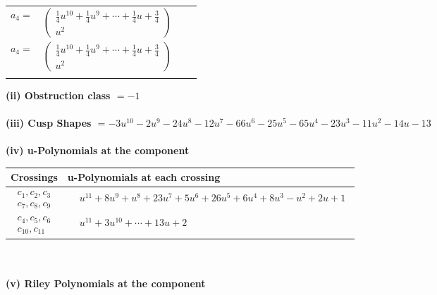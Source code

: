 \documentclass[1p]{elsarticle_modified}
\theoremstyle{definition}
\begin{document}
\begin{tabular}{m{7pt} m{180pt} m{7pt} m{180pt} }
\flushright $a_{4}=$&$\begin{pmatrix}\frac{1}{4} u^{10}+\frac{1}{4} u^9+\cdots+\frac{1}{4} u+\frac{3}{4}\\u^2\end{pmatrix}$\\ \flushright $a_{4}=$&$\begin{pmatrix}\frac{1}{4} u^{10}+\frac{1}{4} u^9+\cdots+\frac{1}{4} u+\frac{3}{4}\\u^2\end{pmatrix}$\\&\end{tabular}
\flushleft \textbf{(ii) Obstruction class $= -1$}\\~\\
\flushleft \textbf{(iii) Cusp Shapes $= -3 u^{10}-2 u^9-24 u^8-12 u^7-66 u^6-25 u^5-65 u^4-23 u^3-11 u^2-14 u-13$}\\~\\
\newpage\renewcommand{\arraystretch}{1}
\flushleft \textbf{(iv) u-Polynomials at the component}\newline \\
\begin{tabular}{m{50pt}|m{274pt}}
Crossings & \hspace{64pt}u-Polynomials at each crossing \\
\hline $$\begin{aligned}c_{1},c_{2},c_{3}\\c_{7},c_{8},c_{9}\end{aligned}$$&$\begin{aligned}
&u^{11}+8 u^9+u^8+23 u^7+5 u^6+26 u^5+6 u^4+8 u^3- u^2+2 u+1
\end{aligned}$\\
\hline $$\begin{aligned}c_{4},c_{5},c_{6}\\c_{10},c_{11}\end{aligned}$$&$\begin{aligned}
&u^{11}+3 u^{10}+\cdots+13 u+2
\end{aligned}$\\
\hline
\end{tabular}\\~\\
\newpage\renewcommand{\arraystretch}{1}
\flushleft \textbf{(v) Riley Polynomials at the component}\newline \\
\end{document}
